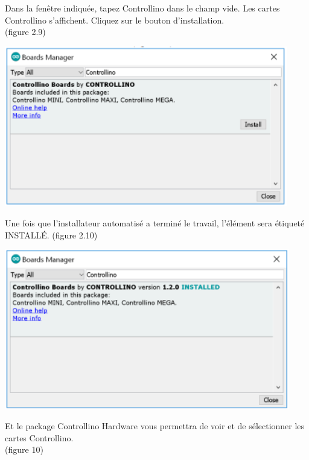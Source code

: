 \documentclass[a4paper,12pt]{report}
\begin{document}
Dans la fenêtre indiquée, tapez Controllino dans le champ vide.
Les cartes Controllino s’affichent. Cliquez sur le bouton d’installation.\\(figure 2.9)\\

\begin{center}
\includegraphics[height=7cm]{la cart de controllino.png}
\label{}
\end{center}

Une fois que l’installateur automatisé a terminé le travail, l’élément sera étiqueté\\
INSTALLÉ. (figure 2.10)\\

\begin{center}
\includegraphics[height=7cm]{ajouter la cart de controllino.png}
\label{}
\end{center}

Et le package Controllino Hardware vous permettra de voir et de sélectionner les cartes Controllino.\\
(figure 10)\\
\end{document}
